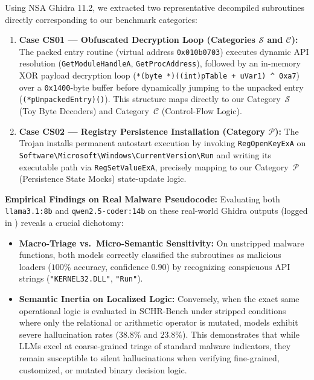 \documentclass[conference]{IEEEtran}
\begin{document}
Using NSA Ghidra 11.2, we extracted two representative decompiled subroutines directly corresponding to our benchmark categories:
\begin{enumerate}
    \item \textbf{Case CS01 --- Obfuscated Decryption Loop (Categories $\mathcal{S}$ and $\mathcal{C}$):} The packed entry routine (virtual address \texttt{0x010b0703}) executes dynamic API resolution (\texttt{GetModuleHandleA}, \texttt{GetProcAddress}), followed by an in-memory XOR payload decryption loop (\texttt{*(byte *)((int)pTable + uVar1) \^{} 0xa7}) over a \texttt{0x1400}-byte buffer before dynamically jumping to the unpacked entry (\texttt{(*pUnpackedEntry)()}). This structure maps directly to our Category~$\mathcal{S}$ (Toy Byte Decoders) and Category~$\mathcal{C}$ (Control-Flow Logic).
    \item \textbf{Case CS02 --- Registry Persistence Installation (Category $\mathcal{P}$):} The Trojan installs permanent autostart execution by invoking \texttt{RegOpenKeyExA} on \texttt{Software\textbackslash Microsoft\textbackslash Windows\textbackslash CurrentVersion\textbackslash Run} and writing its executable path via \texttt{RegSetValueExA}, precisely mapping to our Category~$\mathcal{P}$ (Persistence State Mocks) state-update logic.
\end{enumerate}

\textbf{Empirical Findings on Real Malware Pseudocode:} Evaluating both \texttt{llama3.1:8b} and \texttt{qwen2.5-coder:14b} on these real-world Ghidra outputs (logged in ) reveals a crucial dichotomy:
\begin{itemize}
    \item \textbf{Macro-Triage vs.\ Micro-Semantic Sensitivity:} On unstripped malware functions, both models correctly classified the subroutines as malicious loaders ($100\%$ accuracy, confidence $0.90$) by recognizing conspicuous API strings (\texttt{"KERNEL32.DLL"}, \texttt{"Run"}).
    \item \textbf{Semantic Inertia on Localized Logic:} Conversely, when the exact same operational logic is evaluated in SCHR-Bench under stripped conditions where only the relational or arithmetic operator is mutated, models exhibit severe hallucination rates ($38.8\%$ and $23.8\%$). This demonstrates that while LLMs excel at coarse-grained triage of standard malware indicators, they remain susceptible to silent hallucinations when verifying fine-grained, customized, or mutated binary decision logic.
\end{itemize}
\end{document}
